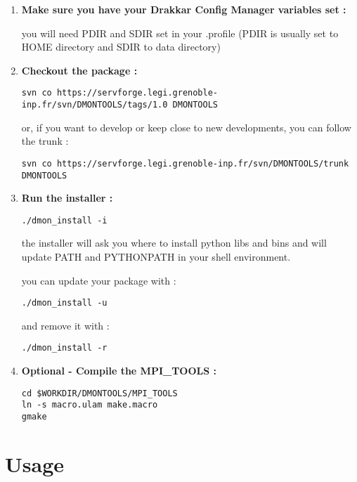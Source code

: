 \documentclass[a4paper,11pt]{article}
\begin{document}
\begin{enumerate}

\item \textbf{Make sure you have your Drakkar Config Manager variables set :}

you will need PDIR and SDIR set in your .profile (PDIR is usually set to HOME directory and
SDIR to data directory)

\item \textbf{Checkout the package :}

\begin{verbatim}
svn co https://servforge.legi.grenoble-inp.fr/svn/DMONTOOLS/tags/1.0 DMONTOOLS
\end{verbatim}

or, if you want to develop or keep close to new developments, you can follow the trunk :

\begin{verbatim}
svn co https://servforge.legi.grenoble-inp.fr/svn/DMONTOOLS/trunk DMONTOOLS
\end{verbatim}

\item \textbf{Run the installer :}

\begin{verbatim}
./dmon_install -i
\end{verbatim}

\noindent
the installer will ask you where to install python libs and bins
and will update PATH and PYTHONPATH in your shell environment.

you can update your package with :

\begin{verbatim}
./dmon_install -u
\end{verbatim}

and remove it with :

\begin{verbatim}
./dmon_install -r
\end{verbatim}

\item \textbf{Optional - Compile the MPI\_TOOLS :}

\begin{verbatim}
cd $WORKDIR/DMONTOOLS/MPI_TOOLS
ln -s macro.ulam make.macro
gmake
\end{verbatim}

\end{enumerate}

\clearpage
\newpage

\section{Usage}
\end{document}
